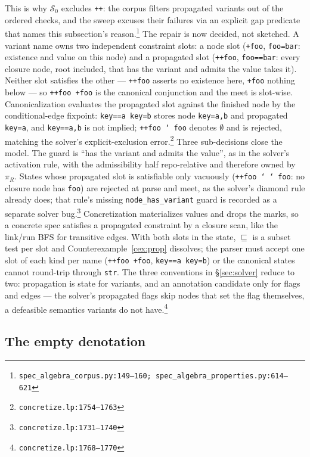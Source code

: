 \documentclass[11pt]{article}
\theoremstyle{definition}
\theoremstyle{remark}
\newcommand{\sat}{\sqsubseteq}
\newcommand{\Spec}{\mathcal{S}}
\newcommand{\code}[1]{\texttt{#1}}
\newcommand{\src}[1]{\footnote{\code{#1}}}
\begin{document}
This is why $\Spec_0$ excludes \code{++}: the corpus filters propagated
variants out of the ordered checks, and the sweep excuses their failures via
an explicit gap predicate that names this
subsection's reason.\src{spec\_algebra\_corpus.py:149--160;
spec\_algebra\_properties.py:614--621}  The repair is now decided, not
sketched.  A variant name owns two independent constraint slots: a node
slot (\code{+foo}, \code{foo=bar}: existence and value on this node) and a
propagated slot (\code{++foo}, \code{foo==bar}: every closure node, root
included, that has the variant and admits the value takes it).  Neither
slot satisfies the other --- \code{++foo} asserts no existence here,
\code{+foo} nothing below --- so \code{++foo +foo} is the canonical
conjunction and the meet is slot-wise.  Canonicalization evaluates the
propagated slot against the finished node by the conditional-edge fixpoint:
\code{key==a key=b} stores node \code{key=a,b} and propagated
\code{key=a}, and \code{key==a,b} is not implied; \code{++foo \char`~foo}
denotes $\emptyset$ and is rejected, matching the solver's
explicit-exclusion error.\src{concretize.lp:1754--1763}  Three
sub-decisions close the model.  The guard is ``has the variant and admits
the value'', as in the solver's activation rule, with the admissibility
half repo-relative and therefore owned by $\pi_R$.  States whose propagated
slot is satisfiable only vacuously (\code{++foo \char`~\char`~foo}: no
closure node has \code{foo}) are rejected at parse and meet, as the
solver's diamond rule already does; that rule's missing
\code{node\_has\_variant} guard is recorded as a separate solver
bug.\src{concretize.lp:1731--1740}  Concretization materializes values and
drops the marks, so a concrete spec satisfies a propagated constraint by a
closure scan, like the link/run BFS for transitive edges.  With both slots
in the state, $\sat$ is a subset test per slot and
Counterexample~\ref{cex:prop} dissolves; the parser must accept one slot of
each kind per name (\code{++foo +foo}, \code{key==a key=b}) or the
canonical states cannot round-trip through \code{str}.  The three
conventions in \S\ref{sec:solver} reduce to two: propagation is state for
variants, and an annotation candidate only for flags and edges --- the
solver's propagated flags skip nodes that set the flag themselves, a
defeasible semantics variants do not have.\src{concretize.lp:1768--1770}

\subsection{The empty denotation}\label{sec:empty}
\end{document}
